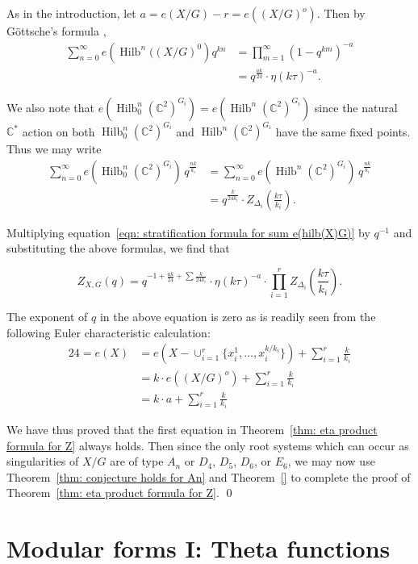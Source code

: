\documentclass{article}
\theoremstyle{definition}
\newcommand{\CC} {{\mathbb C}}          %
\newcommand{\Hilb}{\operatorname{Hilb}}
\begin{document}
As in the introduction, let $a = e(X/G)-r=e\left((X/G)^{o}
\right)$. Then by G\"ottsche's formula \cite{gottsche1990betti},
\begin{align*}
\sum_{n=0}^{\infty} e\left(\Hilb^{n}((X/G)^{0} \right) q^{kn} &=
\prod_{m=1}^{\infty} (1-q^{km})^{-a}\\
&= q^{\frac{ak}{24}} \cdot \eta (k\tau )^{-a}. 
\end{align*}

We also note that $e\left(\Hilb_{0}^{n}(\CC^{2})^{G_{i}}
\right)=e\left(\Hilb^{n}(\CC^{2})^{G_{i}} \right)$ since the natural
$\CC^{*}$ action on both $\Hilb_{0}^{n}(\CC^{2})^{G_{i}}$ and
$\Hilb^{n}(\CC^{2})^{G_{i}}$ have the same fixed points. Thus we may
write
\begin{align*}
\sum_{n=0}^{\infty} e\left(\Hilb_{0}^{n}(\CC^{2})^{G_{i}} \right) \,
q^{\frac{nk}{k_{i}}} &= \sum_{n=0}^{\infty} e\left(\Hilb^{n}(\CC^{2})^{G_{i}} \right) \,
q^{\frac{nk}{k_{i}}}\\
&= q^{\frac{k}{24k_{i}}} \cdot Z_{\Delta_{i}} \left(\frac{k\tau}{k_{i}}
\right) .
\end{align*}

Multiplying equation~\eqref{eqn: stratification formula for sum
e(hilb(X)G)} by $q^{-1}$ and substituting the above formulas, we find
that

\[
Z_{X,G}(q) = q^{-1 +\frac{ak}{24} + \sum \frac{k}{24k_{i}} } \cdot 
\eta (k\tau )^{-a}\cdot 
\prod_{i=1}^{r}Z_{\Delta_{i}}\left(\frac{k\tau}{k_{i}} \right) .
\]

The exponent of $q$ in the above equation is zero as is readily seen
from the following Euler characteristic calculation:
\begin{align*}
24 = e(X) &= e\left(X-\cup_{i=1}^{r} \{x_{i}^{1},\dotsc
,x_{i}^{k/k_{i}} \} \right) + \sum_{i=1}^{r} \frac{k}{k_{i}} \\
&= k \cdot e\left((X/G)^{o} \right) + \sum_{i=1}^{r} \frac{k}{k_{i}} \\
&= k\cdot a + \sum_{i=1}^{r}\frac{k}{k_{i}} 
\end{align*}

We have thus proved that the first equation in Theorem~\ref{thm: eta
product formula for Z} always holds. Then since the only root systems
which can occur as singularities of $X/G$ are of type $A_{n}$ or
$D_{4}$, $D_{5}$, $D_{6}$, or $E_{6}$, we may now use
Theorem~\ref{thm: conjecture holds for An} and Theorem~\ref{} to
complete the proof of Theorem~\ref{thm: eta product formula for
Z}. \qed

\section{Modular forms I: Theta functions}\label{sec: modular forms}
\end{document}

